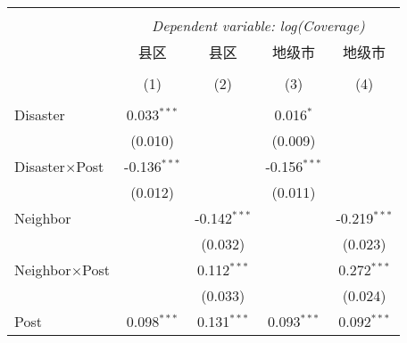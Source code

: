 
\begin{tabular}{@{\extracolsep{5pt}}lcccc}
    \\[-1.8ex]\hline
    \hline                                                                                                                                                 \\[-1.8ex]
                        & \multicolumn{4}{c}{\textit{Dependent variable: log(Coverage)}} \
    \cr \cline{2-5}
    \\[-1.8ex] & \multicolumn{1}{c}{县区} & \multicolumn{1}{c}{县区} & \multicolumn{1}{c}{地级市} & \multicolumn{1}{c}{地级市}  \\
    \\[-1.8ex] & (1) & (2) & (3) & (4) \\
    \hline                                                                                                                                                 \\[-1.8ex]
    Disaster            & 0.033$^{***}$                                                        &                   & 0.016$^{*}$       &                   \\
                        & (0.010)                                                              &                   & (0.009)           &                   \\
    Disaster$\times$Post       & -0.136$^{***}$                                                       &                   & -0.156$^{***}$    &                   \\
                        & (0.012)                                                              &                   & (0.011)           &                   \\
    Neighbor            &                                                                      & -0.142$^{***}$    &                   & -0.219$^{***}$    \\
                        &                                                                      & (0.032)           &                   & (0.023)           \\
    Neighbor$\times$Post       &                                                                      & 0.112$^{***}$     &                   & 0.272$^{***}$     \\
                        &                                                                      & (0.033)           &                   & (0.024)           \\
    Post                & 0.098$^{***}$                                                        & 0.131$^{***}$     & 0.093$^{***}$     & 0.092$^{***}$     \\

\end{tabular}
